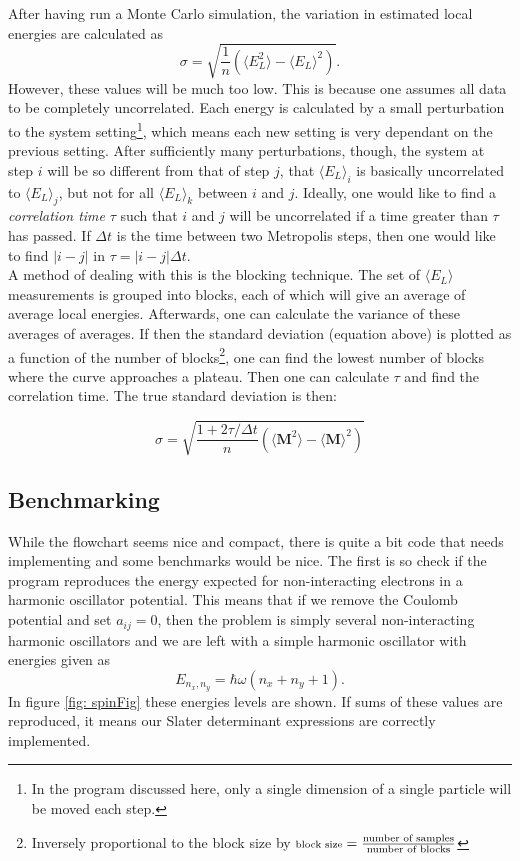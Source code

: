 \documentclass[english, a4paper]{article}
\newcommand\lr[1]{\left(#1\right)}
\begin{document}
	After having run a Monte Carlo simulation, the variation in estimated local energies are calculated as
	\begin{equation}
		\sigma = \sqrt{\frac{1}{n}\lr{\langle E_L^2 \rangle - \langle E_L \rangle^2}}. \label{uncorelatedVariance}
	\end{equation} 
	However, these values will be much too low.
	This is because one assumes all data to be completely uncorrelated. Each energy is calculated by a small perturbation to the system setting\footnote{In the program discussed here, only a single dimension of a single particle will be moved each step.}, which means each new setting is very dependant on the previous setting. After sufficiently many perturbations, though, the system at step $i$ will be so different from that of step $j$, that $\langle E_L\rangle_i$ is basically uncorrelated to  $\langle E_L\rangle_j$, but not for all $\langle E_L\rangle_k$ between $i$ and $j$. Ideally, one would like to find a \emph{correlation time} $\tau$ such that $i$ and $j$ will be uncorrelated if a time greater than $\tau$ has passed. If $\Delta t$ is the time between two Metropolis steps, then one would like to find $|i-j|$ in $\tau = |i-j|\Delta t$.\\
	A method of dealing with this is the blocking technique. The set of $\langle E_L\rangle$ measurements is grouped into blocks, each of which will give an average of average local energies. Afterwards, one can calculate the variance of these averages of averages. If then the standard deviation (equation above) is plotted as a function of the number of blocks\footnote{Inversely proportional to the block size by $\text{\scriptsize block size} = \frac{\text{number of samples}}{\text{number of blocks}}$}, one can find the lowest number of blocks where the curve approaches a plateau. Then one can calculate $\tau$ and find the correlation time. The true standard deviation is then:
	
	\begin{equation}
		\sigma=\sqrt{\frac{1+2\tau/\Delta t}{n}\left(\langle \mathbf{M}^2\rangle-\langle \mathbf{M}\rangle^2\right)}
	\end{equation}
	
	\subsection{Benchmarking}
	While the flowchart seems nice and compact, there is quite a bit code that needs implementing and some benchmarks would be nice. The first is so check if the program reproduces the energy expected for non-interacting electrons in a harmonic oscillator potential. This means that if we remove the Coulomb potential and set $a_{ij} = 0$, then the problem is simply several non-interacting harmonic oscillators and we are left with a simple harmonic oscillator with energies given as
	\begin{equation}
	E_{n_x,n_y} = \hbar\omega\lr{n_x + n_y +1}.
	\end{equation}
	In figure \ref{fig: spinFig} these energies levels are shown. If sums of these values are reproduced, it means our Slater determinant expressions are correctly implemented.
		
\end{document}
